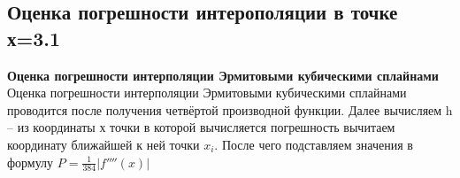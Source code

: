 \documentclass[russian,utf8,nocolumnxxxi,nocolumnxxxii]{eskdtext}
\begin{document}
\newpage

\subsection{Оценка погрешности интерополяции в точке х=3.1}
{\bf Оценка погрешности интерполяции Эрмитовыми
кубическими сплайнами}
 Оценка погрешности интерполяции Эрмитовыми
кубическими сплайнами проводится после получения четвёртой производной функции. Далее вычисляем h -- из координаты х точки в которой вычисляется погрешность вычитаем координату ближайшей к ней точки $x_i$. После чего подставляем значения в формулу $P=\frac{1}{384}|f''''(x)|$
\end{document}
